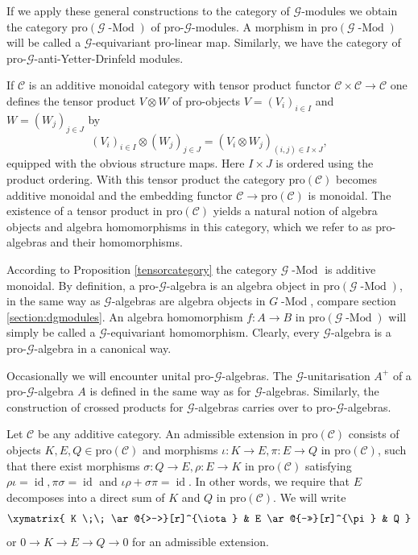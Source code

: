 \documentclass{amsart}
\newcommand{\G}{\mathcal{G}}
\newcommand{\pro}{\mathrm{pro}}
\DeclareMathOperator{\id}{id}
\begin{document}
If we apply these general constructions to the category of $ \G $-modules we obtain the category $ \pro(\G \operatorname{-Mod}) $ of pro-$ \G $-modules.
A morphism in $ \pro(\G \operatorname{-Mod}) $ will be called a $ \G $-equivariant pro-linear
map. Similarly, we have the category of pro-$ \G $-anti-Yetter-Drinfeld modules. 

If $ \mathcal{C} $ is an additive monoidal category with tensor product functor $ \mathcal{C} \times \mathcal{C} \rightarrow \mathcal{C} $ one defines the tensor 
product $ V \otimes W $ of pro-objects $ V = (V_i)_{i \in I} $ and $ W =  (W_j)_{j \in J} $ by
\begin{equation*}
(V_i)_{i \in I} \otimes (W_j)_{j \in J} =
(V_i \otimes W_j)_{(i,j) \in I \times J},
\end{equation*}
equipped with the obvious structure maps. Here $ I \times J $ is ordered using the product ordering. 
With this tensor product the category $ \pro(\mathcal{C}) $ becomes additive monoidal and the embedding functor $ \mathcal{C} \rightarrow \pro(\mathcal{C}) $ is monoidal. The existence of a tensor product in $ \pro(\mathcal{C}) $ yields a natural notion of algebra objects and algebra homo\-morphisms in this category, which we refer to as pro-algebras and their homomor\-phisms. 

According to Proposition \ref{tensorcategory} the category $ \G\operatorname{-Mod} $ is additive monoidal. 
By definition, a pro-$ \G $-algebra is an algebra object in $ \pro(\G \operatorname{-Mod}) $, in the same way as $ \G $-algebras are algebra objects in $ G \operatorname{-Mod} $, compare section \ref{section:dgmodules}. An algebra homo\-morphism $ f: A \rightarrow B $ in $ \pro(\G \operatorname{-Mod}) $ will simply be called a $ \G $-equivariant homomor\-phism. Clearly, every $ \G $-algebra is a pro-$ \G $-algebra in a canonical way. 

Occasionally we will encounter unital pro-$ \G $-algebras. The $ \G $-unitarisation $ A^+ $ of a pro-$ \G $-algebra $ A $ is defined in the same way as for $ \G $-algebras. Similarly, the construction of crossed products for $ \G $-algebras carries over to pro-$ \G $-algebras.

Let $ \mathcal{C} $ be any additive category. An admissible extension in $ \pro(\mathcal{C}) $ consists of objects $ K, E, Q \in \pro(\mathcal{C}) $ and morphisms $ \iota: K \rightarrow E, \pi: E \rightarrow Q $ in $ \pro(\mathcal{C}) $, such that there exist morphisms $ \sigma: Q \rightarrow E, \rho: E \rightarrow K $ in $ \pro(\mathcal{C}) $ satisfying $ \rho \iota = \id, \pi \sigma = \id $ and $ \iota \rho + \sigma \pi = \id $. In other words, we require that $ E $ decomposes into a direct sum of 
$ K $ and $ Q $ in $ \pro(\mathcal{C}) $. We will  write
\begin{equation*}
   \xymatrix{
     K \;\; \ar@{>->}[r]^{\iota} & E \ar@{->>}[r]^{\pi} & Q 
     }
\end{equation*}
or $ 0 \rightarrow K \rightarrow E \rightarrow Q 
\rightarrow 0 $ for an admissible extension. 
\end{document}
